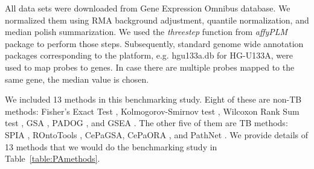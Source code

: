 
All   data sets were downloaded from Gene Expression Omnibus database. We normalized them using RMA background adjustment, quantile normalization, and median polish summarization.  We used the \textit{threestep} function from \textit{affyPLM} package to perform those steps. Subsequently, standard genome wide annotation packages corresponding to the platform, e.g. hgu133a.db for HG-U133A, were used to map probes to genes. In case there are multiple probes mapped to the same gene, the median value is chosen.

We included 13 methods in this benchmarking study. Eight of these are non-TB methods: Fisher's Exact Test \cite{Fisher:1951}, Kolmogorov-Smirnov test \cite{massey1951kolmogorov}, Wilcoxon Rank Sum test \cite{wilcoxon1945individual}, GSA \cite{Efron:2007}, PADOG \cite{Tarca2012down}, and GSEA \cite{Subramanian:2005}. The other five of them are TB methods: SPIA \cite{SPIAversion2.14.0}, ROntoTools \cite{RontoToolsVersion1.2.0}, CePaGSA, CePaORA \cite{gu2012centrality, gu2013cepa}, and PathNet \cite{Dutta:2012}. We provide details of 13 methods that we would do the benchmarking study in Table~\ref{table:PAmethods}. 

